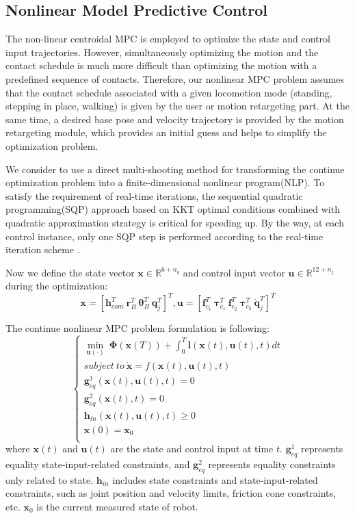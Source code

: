 \documentclass[a4paper, 10pt, conference]{ieeeconf}      %
\begin{document}
\subsection{Nonlinear Model Predictive Control}
The non-linear centroidal MPC is employed to optimize the state and control input trajectories. However, simultaneously optimizing the motion and the contact schedule is much more difficult than optimizing the motion with a predefined sequence of contacts. Therefore, our nonlinear MPC problem assumes that the contact schedule associated with a given locomotion mode (standing, stepping in place, walking) is given by the user or motion retargeting part. At the same time, a desired base pose and velocity trajectory is provided by the motion retargeting module, which provides an initial guess and helps to simplify the optimization problem.

We consider to use a direct multi-shooting method for transforming the continue optimization problem into a finite-dimensional nonlinear program(NLP). To satisfy the requirement of real-time iterations, the sequential quadratic programming(SQP) approach based on KKT optimal conditions combined with quadratic approximation strategy \cite{c4} is critical for speeding up. By the way, at each control instance, only one SQP step is performed according to the real-time iteration scheme \cite{c33}.

Now we define the state vector $\bm{x} \in \mathbb{R}^{6+n_q}$ and control input vector $\bm{u} \in \mathbb{R}^{12+n_j}$ during the optimization:
\begin{equation}
\label{eq:state_vector}
    \bm{x} = [\bm{h}_{com}^T \ \bm{r}^T_B \ \bm{\theta}_B^T \ \bm{q}^T_j]^T, \bm{u} = [\bm{f}^T_{c_{1}} \ \bm{\tau}^T_{c_{1}} \ \bm{f}^T_{c_{2}} \ \bm{\tau}^T_{c_{2}} \  \bm{\dot{q}}_j^T]^T
\end{equation}

The continue nonlinear MPC problem formulation is following:
\begin{equation}
\label{eq:MPC}
    \left\{\begin{array}{l} 
    \min\limits_{\bm{u}(\cdot)} \ \bm{\Phi}(\bm{x}(T)) + \int_0^T \bm{l}(\bm{x}(t),\bm{u}(t),t)dt \\
    subject \ to \ \bm{\dot{x}} = f(\bm{x}(t), \bm{u}(t), t) \\
    \bm{g}^1_{eq}(\bm{x}(t), \bm{u}(t), t) = 0 \\
    \bm{g}^2_{eq}(\bm{x}(t),t) = 0 \\
    \bm{h}_{in}(\bm{x}(t),\bm{u}(t),t) \ge 0 \\
    \bm{x}(0) = \bm{x}_0 \\ 
    \end{array}\right.
\end{equation}
where $\bm{x}(t)$ and $\bm{u}(t)$ are the state and control input at time $t$. $\bm{g}^1_{eq}$ represents equality state-input-related constraints, and $\bm{g}^2_{eq}$ represents equality constraints only related to state. $\bm{h}_{in}$ includes state constraints and state-input-related constraints, such as joint position and velocity limits, friction cone constraints, etc. $\bm{x}_0$ is the current measured state of robot.
\end{document}
